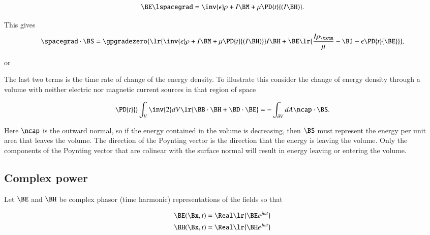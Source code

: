\begin{dmath}\label{eqn:maxwellsEquations:660}
\BE \lspacegrad = \inv{\epsilon} \rho + I \BM + \mu \PD{t}{(I\BH)}.
\end{dmath}

This gives
\begin{dmath}\label{eqn:maxwellsEquations:680}
\spacegrad \cdot \BS
=
\gpgradezero
{
\lr{ \inv{\epsilon} \rho + I \BM + \mu \PD{t}{(I\BH)} } I \BH
+
\BE
\lr
{
\frac{I \rho_\txtm}{\mu} - \BJ - \epsilon \PD{t}{\BE}
}
}
,
\end{dmath}

or

The last two terms is the time rate of change of the energy density.
To illustrate this consider the change of energy density through a volume with neither electric nor magnetic current sources in that region of space

\begin{dmath}\label{eqn:maxwellsEquations:740}
\PD{t}{} \int_V
\inv{2} dV \lr{
\BB \cdot \BH
+ \BD \cdot \BE
}
=
-\int_{\partial V} dA \ncap \cdot \BS.
\end{dmath}

Here \( \ncap \) is the outward normal, so if the energy contained in the volume is decreasing, then \( \BS \) must represent the energy per unit area that leaves the volume.
The direction of the Poynting vector is the direction that the energy is leaving the volume.
Only the components of the Poynting vector that are colinear with the surface normal will result in energy leaving or entering the volume.

\subsection{Complex power}

Let \( \BE \) and \( \BH \) be complex phasor (time harmonic) representations of the fields so that

\begin{dmath}\label{eqn:maxwellsEquations:900}
\begin{aligned}
\BE(\Bx, t) &= \Real\lr{ \BE e^{j \omega t} } \\
\BH(\Bx, t) &= \Real\lr{ \BH e^{j \omega t} }
\end{aligned}
\end{dmath}

